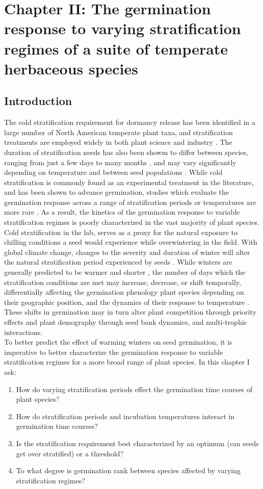 \documentclass{article}\usepackage[]{graphicx}\usepackage[]{color}
\begin{document}
\section*{Chapter II: The germination response to varying stratification regimes of a suite of temperate herbaceous species}
\subsection*{Introduction}
\indent\indent The cold stratification requirement for dormancy release has been identified in a large number of North American temperate plant taxa, and stratification treatments are employed widely in both plant science and industry \citep{Hartmann_2011}. The duration of stratification needs has also been showm to differ between species, ranging from just a few days to many months \citep{Luna2009}, and may vary significantly depending on temperature and between seed populations \citep{Steadman2004}. While cold stratification is commonly found as an experimental treatment in the literature, and has been shown to advance germination, studies which evaluate the germination response across a range of stratification periods or temperatures are more rare \citep{Batlla2009}. As a result, the kinetics of the germination response to variable stratification regimes is poorly characterized in the vast majority of plant species.\\
\indent Cold stratification in the lab, serves as a proxy for the natural exposure to chilling conditions a seed would experience while overwintering in the field. With global climate change, changes to the severity and duration of winter will alter the natural stratification period experienced by seeds \citep{Walck2011}. While winters are generally predicted to be warmer and shorter \citep{IPCC_2014}, the number of days which the stratification conditions are met may increase, decrease, or shift temporally, differentially affecting the germination phenology plant species depending on their geographic position, and the dynamics of their response to temperature \citep{Walck2011}. These shifts in germination may in turn alter plant competition through priority effects \citep{Gioria2018} and plant demography through seed bank dynamics, and multi-trophic interactions.\\
\indent To better predict the effect of warming winters on seed germination, it is imperative to better characterize the germination response to variable stratification regimes for a more broad range of plant species. In this chapter I ask:
\begin{enumerate}
\item How do varying stratification periods effect the germination time courses of plant species?
\item How do stratification periods and incubation temperatures interact in germination time courses?
\item Is the stratification requirement best characterized by an optimum (can seeds get over stratified) or a threshold?
\item To what degree is germination rank between species affected by varying stratification regimes?
\end{enumerate}
\end{document}
